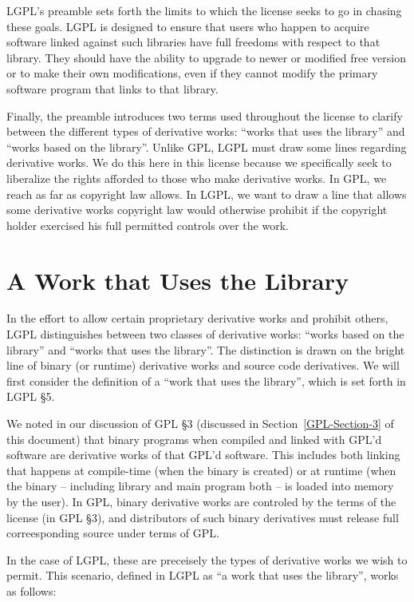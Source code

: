 \documentclass[12pt]{report}
\begin{document}
LGPL's preamble sets forth the limits to which the license seeks to go in
chasing these goals.  LGPL is designed to ensure that users who happen to
acquire software linked against such libraries have full freedoms with
respect to that library.  They should have the ability to upgrade to newer
or modified free version or to make their own modifications, even if they
cannot modify the primary software program that links to that library.

Finally, the preamble introduces two terms used throughout the license to
clarify between the different types of derivative works: ``works that uses
the library'' and ``works based on the library''.  Unlike GPL, LGPL must
draw some lines regarding derivative works.  We do this here in this
license because we specifically seek to liberalize the rights afforded to
those who make derivative works.  In GPL, we reach as far as copyright law
allows.  In LGPL, we want to draw a line that allows some derivative works
copyright law would otherwise prohibit if the copyright holder exercised
his full permitted controls over the work.

\section{A Work that Uses the Library}

In the effort to allow certain proprietary derivative works and prohibit
others, LGPL distinguishes between two classes of derivative works:
``works based on the library'' and ``works that uses the library''.  The
distinction is drawn on the bright line of binary (or runtime) derivative
works and source code derivatives.  We will first consider the definition
of a ``work that uses the library'', which is set forth in LGPL \S 5.

We noted in our discussion of GPL \S 3 (discussed in
Section~\ref{GPL-Section-3} of this document) that binary programs when
compiled and linked with GPL'd software are derivative works of that GPL'd
software.  This includes both linking that happens at compile-time (when
the binary is created) or at runtime (when the binary -- including library
and main program both -- is loaded into memory by the user).  In GPL,
binary derivative works are controled by the terms of the license (in GPL
\S 3), and distributors of such binary derivatives must release full
correesponding source under terms of GPL\@.

In the case of LGPL, these are preceisely the types of derivative works
we wish to permit.  This scenario, defined in LGPL as ``a work that uses
the library'', works as follows:
\end{document}
